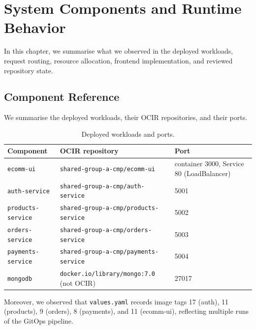 \chapter{System Components and Runtime Behavior}\label{chap:results}

In this chapter, we summarise what we observed in the deployed workloads,
request routing, resource allocation, frontend implementation, and reviewed
repository state.

\section{Component Reference}\label{sec:primary-finding-one}
We summarise the deployed workloads, their OCIR
repositories, and their ports.

\begin{table}[H]
\centering
\caption{Deployed workloads and ports.}
\label{tab:component-reference}
\small
\begin{tabularx}{\textwidth}{>{\raggedright\arraybackslash}p{3cm}
                >{\raggedright\arraybackslash}X l}
\toprule
\textbf{Component} & \textbf{OCIR repository} & \textbf{Port} \\
\midrule
\texttt{ecomm-ui} & \texttt{shared-\allowbreak group-\allowbreak a-cmp/\allowbreak ecomm-ui} & container 3000, Service 80 (LoadBalancer) \\
\texttt{auth-service} & \texttt{shared-\allowbreak group-\allowbreak a-cmp/\allowbreak auth-\allowbreak service} & 5001 \\
\texttt{products-\allowbreak service} & \texttt{shared-\allowbreak group-\allowbreak a-cmp/\allowbreak products-\allowbreak service} & 5002 \\
\texttt{orders-\allowbreak service} & \texttt{shared-\allowbreak group-\allowbreak a-cmp/\allowbreak orders-\allowbreak service} & 5003 \\
\texttt{payments-\allowbreak service} & \texttt{shared-\allowbreak group-\allowbreak a-cmp/\allowbreak payments-\allowbreak service} & 5004 \\
\texttt{mongodb} & \texttt{docker.io/\allowbreak library/\allowbreak mongo:7.0} (not OCIR) & 27017 \\
\bottomrule
\end{tabularx}
\end{table}

Moreover, we observed that \texttt{values.yaml} records image tags 17 (auth), 11 (products), 9
(orders), 8 (payments), and 11 (ecomm-ui), reflecting multiple runs of the GitOps
pipeline.

